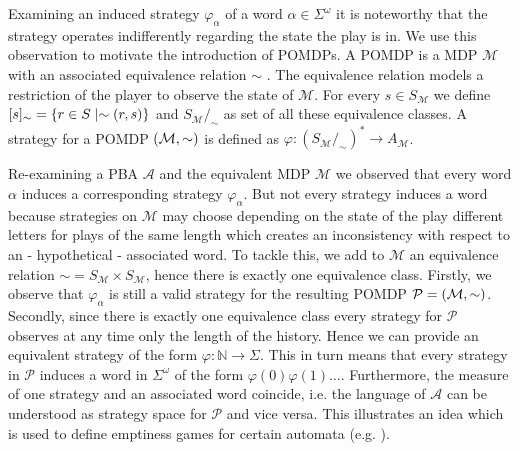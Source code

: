 Examining an induced strategy $\varphi_{\alpha}$ of a word
$\alpha\in\Sigma^{\omega}$ it is noteworthy that the strategy operates
indifferently regarding the state the play is in. We use this observation to
motivate the introduction of \acp{POMDP}. A \ac{POMDP} is a \ac{MDP}
$\mathcal{M}$ with an associated equivalence relation $\sim$
\cite{RandAutoInfTrees}. The equivalence relation models a restriction of the
player to observe the state of $\mathcal{M}$. For every
$s\in S_{\mathcal{M}}$ we define
$[s]_{\sim} = \left\{r\in S\mid \sim(r,s)\right\}$ and
$S_{\mathcal{M}}/_{\sim}$ as set of all these equivalence classes. A
strategy for a \ac{POMDP} $\left(\mathcal{M}, \sim\right)$ is defined as
$\varphi:(S_{\mathcal{M}}/_{\sim})^{*}\rightarrow A_{\mathcal{M}}$.
\begin{example}
  Re-examining a \ac{PBA} $\mathcal{A}$ and the equivalent \ac{MDP}
  $\mathcal{M}$ we observed that every word $\alpha$ induces a corresponding
  strategy $\varphi_{\alpha}$. But not every strategy induces a word because
  strategies on $\mathcal{M}$ may choose depending on the state of the play
  different letters for plays of the same length which creates an inconsistency
  with respect to an - hypothetical - associated word. To tackle this, we add
  to $\mathcal{M}$ an equivalence relation
  $\sim = S_{\mathcal{M}} \times S_{\mathcal{M}}$,
  hence there is exactly one equivalence class. Firstly, we observe that
  $\varphi_{\alpha}$ is still a valid strategy for the resulting \ac{POMDP}
  $\mathcal{P} = \left(\mathcal{M}, \sim\right)$. Secondly, since there is
  exactly one equivalence class every strategy for $\mathcal{P}$ observes at
  any time only the length of the history. Hence we can provide an equivalent
  strategy of the form $\varphi:\mathbb{N}\rightarrow \Sigma$. This in turn
  means that every strategy in $\mathcal{P}$ induces a word in $\Sigma^{\omega}$
  of the form $\varphi(0)\varphi(1)\dots$. Furthermore, the measure of one
  strategy and an associated word coincide, i.e. the language of $\mathcal{A}$
  can be understood as strategy space for $\mathcal{P}$ and vice versa. This
  illustrates an idea which is used to define emptiness games for certain
  automata (e.g. \cite[Proposition 45]{RandAutoInfTrees}).
  \label{ex:pba}
\end{example}

